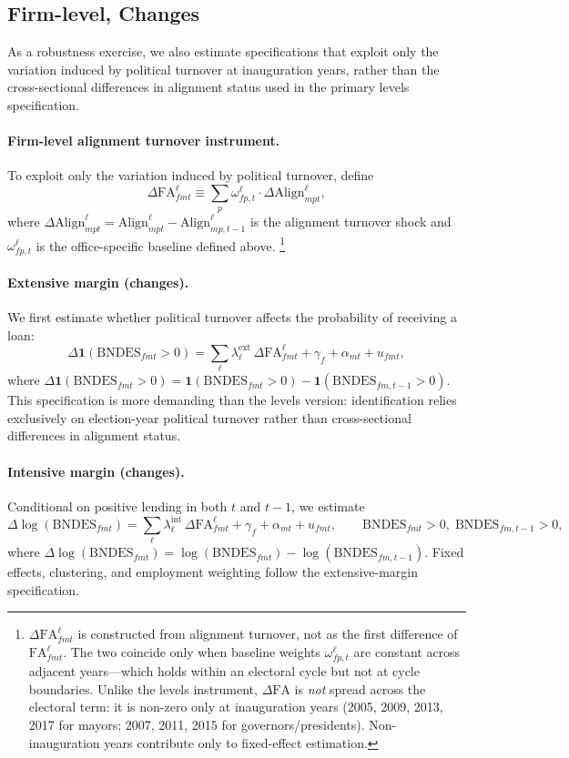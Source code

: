 \documentclass{article}
\newcommand{\Align}{\mathrm{Align}}
\newcommand{\FA}{\mathrm{FA}}
\begin{document}
\subsection{Firm-level, Changes}\label{sec:firm-changes}

As a robustness exercise, we also estimate specifications that exploit only the
variation induced by political turnover at inauguration years, rather than the
cross-sectional differences in alignment status used in the primary levels
specification.

\paragraph{Firm-level alignment turnover instrument.}
To exploit only the variation induced by political turnover, define
\[
  \Delta\FA^{\ell}_{fmt} \equiv \sum_{p} \omega^\ell_{fp,t} \cdot \Delta\Align^{\ell}_{mpt},
\]
where $\Delta\Align^{\ell}_{mpt} = \Align^{\ell}_{mpt} - \Align^{\ell}_{mp,t-1}$
is the alignment turnover shock and $\omega^\ell_{fp,t}$ is the office-specific baseline defined above.%
\footnote{\label{fn:not-first-diff}$\Delta\FA^{\ell}_{fmt}$ is constructed from alignment turnover,
not as the first difference of $\FA^{\ell}_{fmt}$.
The two coincide only when baseline weights $\omega^\ell_{fp,t}$ are constant across
adjacent years---which holds within an electoral cycle but not at cycle boundaries.
Unlike the levels instrument, $\Delta\FA$ is \emph{not} spread across the electoral term:
it is non-zero only at inauguration years (2005, 2009, 2013, 2017 for mayors;
2007, 2011, 2015 for governors/presidents).
Non-inauguration years contribute only to fixed-effect estimation.}

\paragraph{Extensive margin (changes).}
We first estimate whether political turnover affects the probability of receiving a loan:
\[
  \Delta\mathbf{1}(\text{BNDES}_{fmt} > 0) = \sum_{\ell} \lambda^{\text{ext}}_{\ell}\,\Delta\FA^{\ell}_{fmt}
  + \gamma_{f} + \alpha_{mt} + u_{fmt},
\]
where $\Delta\mathbf{1}(\text{BNDES}_{fmt} > 0)
= \mathbf{1}(\text{BNDES}_{fmt} > 0) - \mathbf{1}(\text{BNDES}_{fm,t-1} > 0)$.
This specification is more demanding than the levels version: identification relies exclusively on election-year political turnover rather than cross-sectional differences in alignment status.

\paragraph{Intensive margin (changes).}
Conditional on positive lending in both $t$ and $t-1$, we estimate
\[
  \Delta\log(\text{BNDES}_{fmt}) = \sum_{\ell} \lambda^{\text{int}}_{\ell}\,\Delta\FA^{\ell}_{fmt}
  + \gamma_{f} + \alpha_{mt} + u_{fmt},
  \qquad \text{BNDES}_{fmt} > 0,\; \text{BNDES}_{fm,t-1} > 0,
\]
where $\Delta\log(\text{BNDES}_{fmt}) = \log(\text{BNDES}_{fmt}) - \log(\text{BNDES}_{fm,t-1})$.
Fixed effects, clustering, and employment weighting follow the extensive-margin specification.
\end{document}

